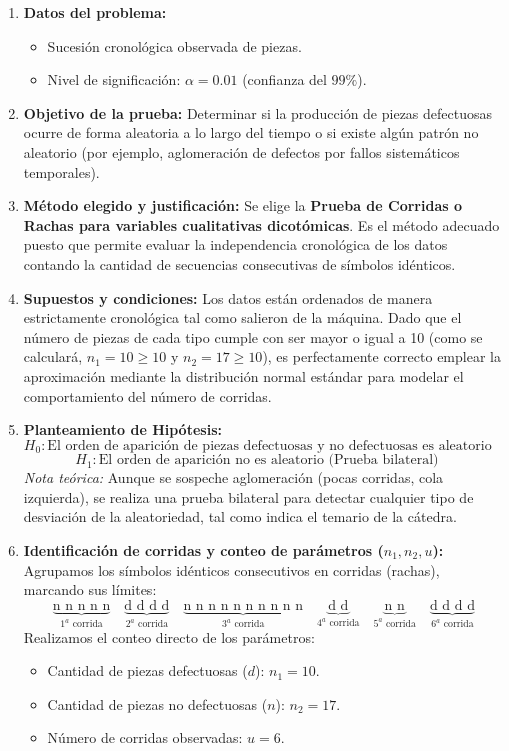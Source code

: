 \documentclass[11pt,a4paper]{article}
\begin{document}
\begin{enumerate}
    \item \textbf{Datos del problema:}
    \begin{itemize}
        \item Sucesión cronológica observada de piezas.
        \item Nivel de significación: $\alpha = 0.01$ (confianza del $99\%$).
    \end{itemize}

    \item \textbf{Objetivo de la prueba:}
    Determinar si la producción de piezas defectuosas ocurre de forma aleatoria a lo largo del tiempo o si existe algún patrón no aleatorio (por ejemplo, aglomeración de defectos por fallos sistemáticos temporales).

    \item \textbf{Método elegido y justificación:}
    Se elige la \textbf{Prueba de Corridas o Rachas para variables cualitativas dicotómicas}. Es el método adecuado puesto que permite evaluar la independencia cronológica de los datos contando la cantidad de secuencias consecutivas de símbolos idénticos.

    \item \textbf{Supuestos y condiciones:}
    Los datos están ordenados de manera estrictamente cronológica tal como salieron de la máquina. Dado que el número de piezas de cada tipo cumple con ser mayor o igual a 10 (como se calculará, $n_1 = 10 \ge 10$ y $n_2 = 17 \ge 10$), es perfectamente correcto emplear la aproximación mediante la distribución normal estándar para modelar el comportamiento del número de corridas.

    \item \textbf{Planteamiento de Hipótesis:}
    \[ H_0: \text{El orden de aparición de piezas defectuosas y no defectuosas es aleatorio} \quad \]
    \[ H_1: \text{El orden de aparición no es aleatorio (Prueba bilateral)} \quad \]
    \textit{Nota teórica:} Aunque se sospeche aglomeración (pocas corridas, cola izquierda), se realiza una prueba bilateral para detectar cualquier tipo de desviación de la aleatoriedad, tal como indica el temario de la cátedra.

    \item \textbf{Identificación de corridas y conteo de parámetros ($n_1, n_2, u$):}
    Agrupamos los símbolos idénticos consecutivos en corridas (rachas), marcando sus límites:
    \[ \underbrace{\text{n n n n n}}_{1^{a}\text{ corrida}} \quad \underbrace{\text{d d d d}}_{2^{a}\text{ corrida}} \quad \underbrace{\text{n n n n n n n n n n}}_{3^{a}\text{ corrida}} \quad \underbrace{\text{d d}}_{4^{a}\text{ corrida}} \quad \underbrace{\text{n n}}_{5^{a}\text{ corrida}} \quad \underbrace{\text{d d d d}}_{6^{a}\text{ corrida}} \]
    Realizamos el conteo directo de los parámetros:
    \begin{itemize}
        \item Cantidad de piezas defectuosas ($d$): $n_1 = 10$.
        \item Cantidad de piezas no defectuosas ($n$): $n_2 = 17$.
        \item Número de corridas observadas: $u = 6$.
    \end{itemize}


\end{enumerate}
\end{document}
